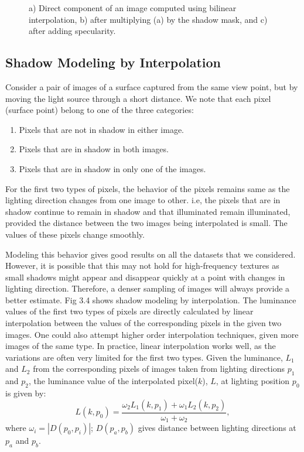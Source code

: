 \begin{figure}[t]
\centering {}  \subfigure[]{
\texttt{[image: image\_eps/shadow\_classify/thresh=110.eps]}
\label{fig:subfig3} } \caption{a) Direct component of an image computed using
bilinear interpolation, b) after multiplying (a) by the shadow mask, and c)
after adding specularity.}
\label{fig:mask}
\end{figure}


\subsection{Shadow Modeling by Interpolation}
Consider a pair of images of a surface captured from the same view point, but by
moving the light source through a short distance. We note that each pixel
(surface point) belong to one of the three categories:
\begin{enumerate}
\item Pixels that are not in shadow in either image.
\item Pixels that are in shadow in both images.
\item Pixels that are in shadow in only one of the images.

\end{enumerate}

For the first two types of pixels, the behavior of the pixels remains same as
the lighting direction changes from one image to other. i.e, the pixels that are
in shadow continue to remain in shadow and that illuminated remain illuminated,
provided the distance between the two images being interpolated is small. The
values of these pixels change smoothly.

Modeling this behavior gives good results on all the datasets that we
considered. However, it is possible that this may not hold for high-frequency
textures as small shadows might appear and disappear quickly at a point with
changes in lighting direction. Therefore, a denser sampling of images will
always provide a better estimate. Fig 3.4 shows shadow
modeling by interpolation. The luminance values of the first two types of
pixels are directly calculated by linear interpolation between the values of the
corresponding pixels in the given two images. One could also attempt higher
order interpolation techniques, given more images of the same type. In practice,
linear interpolation works well, as the variations are often very limited for
the first two types. Given the luminance, $L_1$ and $L_2$ from the
corresponding pixels of images taken from lighting directions $p_1$ and $p_2$,
the luminance value of the interpolated pixel($k$), $L$, at lighting position $p_0$ is given
by:
\begin{equation}
L(k,p_0)=\frac{\omega_2 L_1(k,p_1) + \omega_1 L_2(k,p_2)}{\omega_1 + \omega_2},
\end{equation}
where $\omega_i = |D(p_0,p_i)|$; $D(p_a,p_b)$ gives distance between lighting
directions at $p_a$ and $p_b$.


